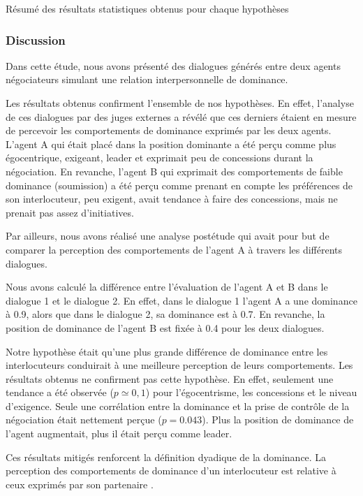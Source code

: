 {\begin{table}[p]
\begin{adjustbox}{angle=90}
					\caption{Résumé des résultats statistiques obtenus pour chaque hypothèses}
					\label{tab:resetude1}
				\end{adjustbox}
			\end{table}
				
			\subsubsection{Discussion}	
			Dans cette étude, nous avons présenté des dialogues générés entre deux agents négociateurs simulant une relation interpersonnelle de dominance. 
			
			Les résultats obtenus confirment l'ensemble de nos hypothèses. En effet, l'analyse de ces dialogues par des juges externes a révélé que ces derniers étaient en mesure de percevoir les comportements de dominance exprimés par les deux agents. L'agent A qui était placé dans la position dominante a été perçu comme plus égocentrique, exigeant, leader et exprimait peu de concessions durant la négociation. En revanche, l'agent B qui exprimait des comportements de faible dominance (soumission) a été perçu comme prenant en compte les préférences de son interlocuteur, peu exigent, avait tendance à faire des concessions, mais ne prenait pas assez d'initiatives.  
			
			Par ailleurs, nous avons réalisé une analyse postétude qui avait pour but de comparer la perception des comportements de l'agent A à travers les différents dialogues. 
			
			Nous avons calculé la différence entre l'évaluation de l'agent A et B dans le dialogue 1 et le dialogue 2. En effet, dans le dialogue 1 l'agent A a une dominance à 0.9, alors que dans le dialogue 2, sa dominance est à 0.7. En revanche, la position de dominance de l'agent B est fixée à 0.4 pour les deux dialogues. 
			
			Notre hypothèse était qu'une plus grande différence de dominance entre les interlocuteurs conduirait à une meilleure perception de leurs comportements. Les résultats obtenus ne confirment pas cette hypothèse. En effet, seulement une tendance a été observée ($ p \simeq 0,1 $) pour l'égocentrisme, les concessions et le niveau d'exigence. Seule une corrélation entre la dominance et la prise de contrôle de la négociation était nettement perçue ($p = 0.043$). Plus la position de dominance de l'agent augmentait, plus il était perçu comme leader. 
			
			Ces résultats mitigés renforcent la définition dyadique de la dominance. La perception des comportements de dominance d'un interlocuteur est relative à ceux exprimés par son partenaire \cite{dunbar2005perceptions}. 
			
}
